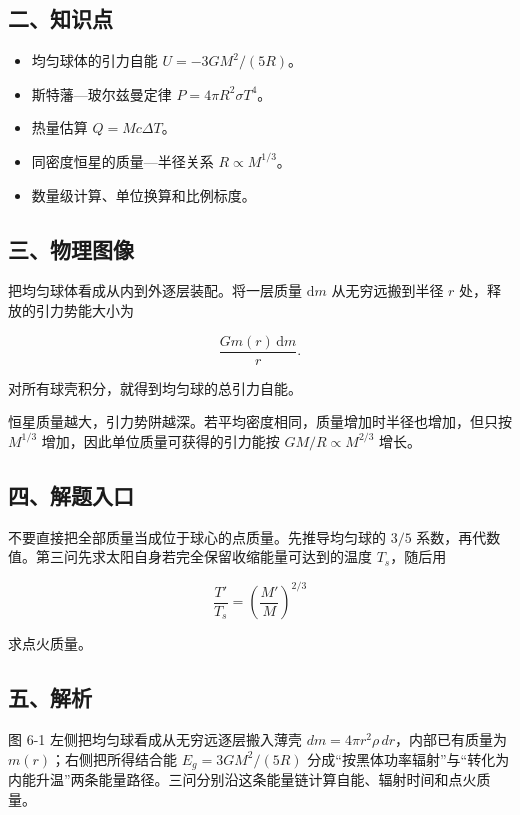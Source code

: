 \documentclass[12pt,a4paper,UTF8]{ctexart}
\newcommand{\tightlist}{\setlength{\itemsep}{0pt}\setlength{\parskip}{0pt}}
\begin{document}
\subsection{二、知识点}\label{ux4e8cux77e5ux8bc6ux70b9-5}

\begin{itemize}
\tightlist
\item
  均匀球体的引力自能 \(U=-3GM^2/(5R)\)。
\item
  斯特藩---玻尔兹曼定律 \(P=4\pi R^2\sigma T^4\)。
\item
  热量估算 \(Q=Mc\Delta T\)。
\item
  同密度恒星的质量---半径关系 \(R\propto M^{1/3}\)。
\item
  数量级计算、单位换算和比例标度。
\end{itemize}

\subsection{三、物理图像}\label{ux4e09ux7269ux7406ux56feux50cf-5}

把均匀球体看成从内到外逐层装配。将一层质量 \(\mathrm dm\)
从无穷远搬到半径 \(r\) 处，释放的引力势能大小为

\[\frac{Gm(r)\,\mathrm dm}{r}.\]

对所有球壳积分，就得到均匀球的总引力自能。

恒星质量越大，引力势阱越深。若平均密度相同，质量增加时半径也增加，但只按
\(M^{1/3}\) 增加，因此单位质量可获得的引力能按 \(GM/R\propto M^{2/3}\)
增长。

\subsection{四、解题入口}\label{ux56dbux89e3ux9898ux5165ux53e3-5}

不要直接把全部质量当成位于球心的点质量。先推导均匀球的 \(3/5\)
系数，再代数值。第三问先求太阳自身若完全保留收缩能量可达到的温度
\(T_s\)，随后用

\[\frac{T'}{T_s}=\left(\frac{M'}{M}\right)^{2/3}\]

求点火质量。

\subsection{五、解析}\label{ux4e94ux89e3ux6790-5}

图 6-1 左侧把均匀球看成从无穷远逐层搬入薄壳
\(dm=4\pi r^2\rho\,dr\)，内部已有质量为 \(m(r)\)；右侧把所得结合能
\(E_g=3GM^2/(5R)\)
分成``按黑体功率辐射''与``转化为内能升温''两条能量路径。三问分别沿这条能量链计算自能、辐射时间和点火质量。
\end{document}

